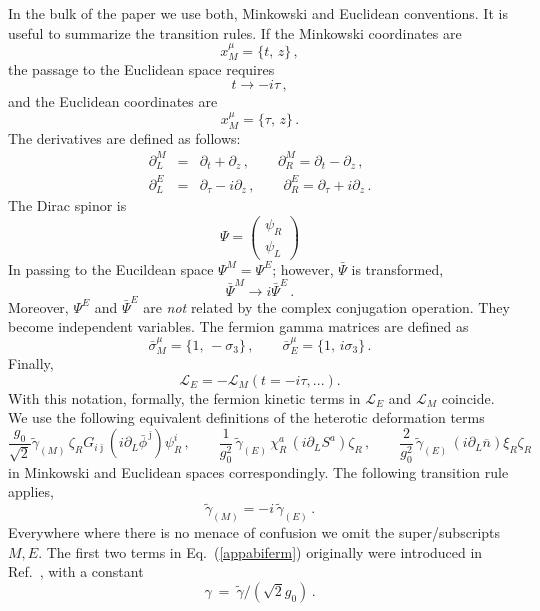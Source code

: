 \documentclass[epsfig,12pt]{article}
\def\beq{\begin{equation}}
\def\eeq{\end{equation}}
\def\beqn{\begin{eqnarray}}
\def\eeqn{\end{eqnarray}}
\newcommand{\cell}{{\mathcal L}}
\newcommand{\pt}{\partial}
\def\beqn{\begin{eqnarray}}
\def\eeqn{\end{eqnarray}}
\def\beq{\begin{equation}}
\def\eeq{\end{equation}}
\newcommand{\p}{\partial}
\newcommand{\wt}{\widetilde}
\newcommand{\ov}{\overline}
\newcommand{\bj}{{\bar \jmath}}
\newcommand{\ssm}{{\scriptscriptstyle(M)}}
\newcommand{\sse}{{\scriptscriptstyle(E)}}
\begin{document}
{In the bulk of the paper we use both, Minkowski and Euclidean conventions.
It is useful to summarize the transition rules.
If the Minkowski coordinates are
\beq
x^\mu_M =\{t,\,z\}\,,
\label{appeone}
\eeq
the passage to the Euclidean space requires
\beq
t \to - i\tau\,,
\label{appe2}
\eeq
and the Euclidean coordinates are
\beq
x^\mu_M =\{\tau,\,z\}\,.
\label{appe3}
\eeq
The derivatives are defined as follows:
\beqn
\pt_L^M &=& \pt_t+\pt_z\,,\qquad \pt_R^M = \pt_t- \pt_z\,,
\nonumber\\[2mm]
\pt_L^E &=& \pt_\tau - i \pt_z\,,\qquad \pt_R^E = \pt_\tau + i \pt_z\,.
\label{appe4}
\eeqn
The Dirac spinor is
\beq
\Psi =\left(
\begin{array}{c}
\psi_R\\[1mm]
\psi_L
\end{array}
\right)
\label{appe5}
\eeq
In passing to the Eucildean space $\Psi^M = \Psi^E$;
however, $\bar\Psi$ is transformed,
\beq
\bar\Psi^M \to i \bar \Psi^E\,.
\label{appe6}
\eeq
Moreover, $\Psi^E$ and $\bar \Psi^E$ are {\em not} related by the complex conjugation operation.
They become independent variables. The fermion gamma matrices are defined as
\beq
\bar\sigma^\mu_M =\{1,\,-\sigma_3\}\,,\qquad \bar\sigma^\mu_E =\{1,\, i\sigma_3\}\,.
\label{appe7}
\eeq
Finally, 
\beq
\cell_E =- \cell_M (t=-i\tau , ...).
\eeq
With this notation, formally, the fermion kinetic terms in $\cell_E $ and $\cell_M $
coincide.
We use the following equivalent definitions of the heterotic deformation terms
\beq
 \frac{g_0}{\sqrt 2} \tilde{\gamma}_\ssm\, \zeta_R G_{i\bj}\left(i\pt_L\bar\phi^{\,\bj}\right)\psi_R^i\,, 
\qquad
  \frac{1}{g_0^2}\, \wt{\gamma}_\sse\, \chi_R^a\, (i\p_L S^a) \zeta_R\,,
\qquad
  \frac{2}{g_0^2}\, \wt{\gamma}_\sse\, (i\p_L \ov{n}) \xi_R \zeta_R\,
\label{appabiferm}
\eeq
in Minkowski and Euclidean spaces correspondingly. 
The following transition rule applies,
\beq
\wt{\gamma}_\ssm = - i\,\wt\gamma_\sse\,.
\label{appe8}
\eeq
Everywhere where there is no menace of confusion we omit the super/sub\-scripts $M,E$.
The first two terms in Eq.~(\ref{appabiferm}) originally were introduced in Ref.~\cite{SY1}, with 
a constant
\beq
	\gamma ~=~ \wt\gamma / (\sqrt{2}g_0) \,.
\eeq


}
\end{document}
